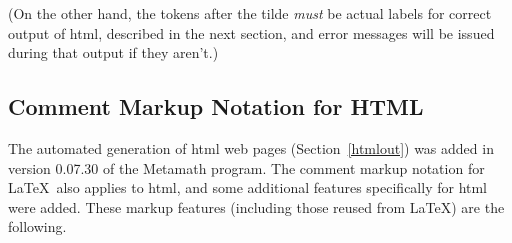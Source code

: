(On the other hand, the tokens after the tilde {\em must} be actual
labels for correct output of {\sc html}, described in the next section,
and error messages will be issued during that output if they aren't.)

\begin{sloppy}
\subsection{Comment Markup No\-ta\-tion for HTML}\label{htmlmkup}
\end{sloppy}

The automated generation of {\sc html} web pages
(Section~\ref{htmlout}) was added in version 0.07.30 of the Metamath program.
The comment markup notation for \LaTeX\ also applies to {\sc html}, and
some additional features specifically for {\sc html} were added.
These markup features (including those reused from \LaTeX) are the
following.

